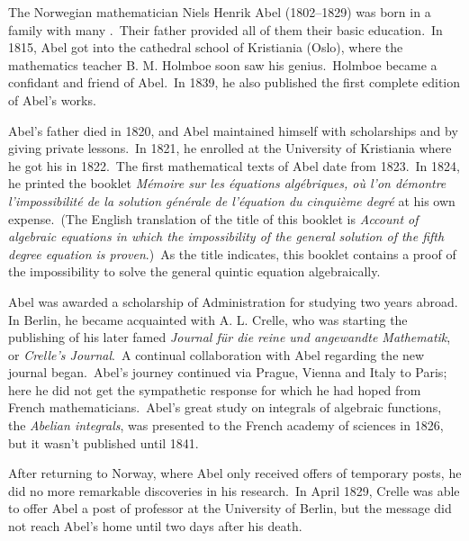 \documentclass[12pt]{article}
\theoremstyle{definition}
\begin{document}

The Norwegian mathematician Niels Henrik Abel (1802--1829) was born in a family with many .\, Their father provided all of them their basic education.\, In 1815, Abel got into the cathedral school of Kristiania (Oslo), where the mathematics teacher B. M. Holmboe soon saw his genius.\, Holmboe became a confidant and friend of Abel.\, In 1839, he also published the first complete edition of Abel's works.

Abel's father died in 1820, and Abel maintained himself with scholarships and by giving private lessons.\, In 1821, he enrolled at the University of Kristiania where he got his  in 1822.\, The first mathematical texts of Abel date from 1823.\, In 1824, he printed the booklet \emph{M\'emoire sur les \'equations alg\'ebriques, o\`u l'on d\'emontre l'impossibilit\'e de la solution g\'en\'erale de l'\'equation du cinqui\`eme degr\'e} at his own expense.\, (The English translation of the title of this booklet is \emph{Account of algebraic equations in which the impossibility of the general solution of the fifth degree equation is proven}.)\, As the title indicates, this booklet contains a proof of the impossibility to solve the general quintic equation algebraically.

Abel was awarded a scholarship of Administration for studying two years abroad.\, In Berlin, he became acquainted with A. L. Crelle, who was starting the publishing of his later famed \emph{Journal f\"ur die reine und angewandte Mathematik}, or \emph{Crelle's Journal}.\, A continual collaboration with Abel regarding the new journal began.\, Abel's journey continued via Prague, Vienna and Italy to Paris; here he did not get the sympathetic response for which he had hoped from French mathematicians.\, Abel's great study on integrals of algebraic functions, the \emph{Abelian integrals}, was presented to the French academy of sciences in 1826, but it wasn't published until 1841.

After returning to Norway, where Abel only received offers of  temporary posts, he did no more remarkable discoveries in his research.\, In April 1829, Crelle was able to offer Abel a post of professor at the University of Berlin, but the message did not reach Abel's home until two days after his death.
\end{document}
